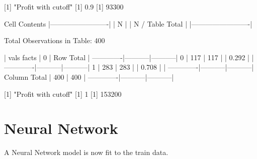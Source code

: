 \documentclass{article}
\begin{document}
\begin{Schunk}
\begin{Soutput}
 
[1] "Profit with cutoff"
[1] 0.9
[1] 93300

 
   Cell Contents
|-------------------------|
|                       N |
|         N / Table Total |
|-------------------------|

 
Total Observations in Table:  400 

 
             | vals 
       facts |         0 | Row Total | 
-------------|-----------|-----------|
           0 |       117 |       117 | 
             |     0.292 |           | 
-------------|-----------|-----------|
           1 |       283 |       283 | 
             |     0.708 |           | 
-------------|-----------|-----------|
Column Total |       400 |       400 | 
-------------|-----------|-----------|

 
[1] "Profit with cutoff"
[1] 1
[1] 153200
\end{Soutput}
\end{Schunk}

\section*{Neural Network}
A Neural Network model is now fit to the train data. 
\end{document}
